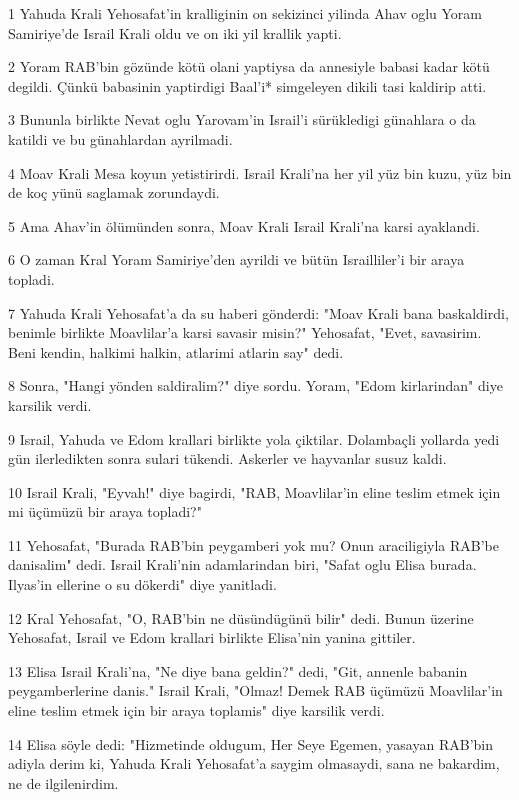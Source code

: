 \par 1 Yahuda Krali Yehosafat'in kralliginin on sekizinci yilinda Ahav oglu Yoram Samiriye'de Israil Krali oldu ve on iki yil krallik yapti.
\par 2 Yoram RAB'bin gözünde kötü olani yaptiysa da annesiyle babasi kadar kötü degildi. Çünkü babasinin yaptirdigi Baal'i* simgeleyen dikili tasi kaldirip atti.
\par 3 Bununla birlikte Nevat oglu Yarovam'in Israil'i sürükledigi günahlara o da katildi ve bu günahlardan ayrilmadi.
\par 4 Moav Krali Mesa koyun yetistirirdi. Israil Krali'na her yil yüz bin kuzu, yüz bin de koç yünü saglamak zorundaydi.
\par 5 Ama Ahav'in ölümünden sonra, Moav Krali Israil Krali'na karsi ayaklandi.
\par 6 O zaman Kral Yoram Samiriye'den ayrildi ve bütün Israilliler'i bir araya topladi.
\par 7 Yahuda Krali Yehosafat'a da su haberi gönderdi: "Moav Krali bana baskaldirdi, benimle birlikte Moavlilar'a karsi savasir misin?" Yehosafat, "Evet, savasirim. Beni kendin, halkimi halkin, atlarimi atlarin say" dedi.
\par 8 Sonra, "Hangi yönden saldiralim?" diye sordu. Yoram, "Edom kirlarindan" diye karsilik verdi.
\par 9 Israil, Yahuda ve Edom krallari birlikte yola çiktilar. Dolambaçli yollarda yedi gün ilerledikten sonra sulari tükendi. Askerler ve hayvanlar susuz kaldi.
\par 10 Israil Krali, "Eyvah!" diye bagirdi, "RAB, Moavlilar'in eline teslim etmek için mi üçümüzü bir araya topladi?"
\par 11 Yehosafat, "Burada RAB'bin peygamberi yok mu? Onun araciligiyla RAB'be danisalim" dedi. Israil Krali'nin adamlarindan biri, "Safat oglu Elisa burada. Ilyas'in ellerine o su dökerdi" diye yanitladi.
\par 12 Kral Yehosafat, "O, RAB'bin ne düsündügünü bilir" dedi. Bunun üzerine Yehosafat, Israil ve Edom krallari birlikte Elisa'nin yanina gittiler.
\par 13 Elisa Israil Krali'na, "Ne diye bana geldin?" dedi, "Git, annenle babanin peygamberlerine danis." Israil Krali, "Olmaz! Demek RAB üçümüzü Moavlilar'in eline teslim etmek için bir araya toplamis" diye karsilik verdi.
\par 14 Elisa söyle dedi: "Hizmetinde oldugum, Her Seye Egemen, yasayan RAB'bin adiyla derim ki, Yahuda Krali Yehosafat'a saygim olmasaydi, sana ne bakardim, ne de ilgilenirdim.
